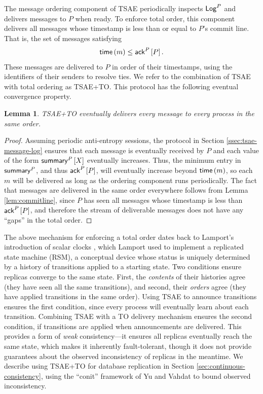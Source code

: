 \documentclass[]             %
{NASA}                       %
\newtheorem{lemma}[theorem]{Lemma}
\theoremstyle{definition}
\begin{document}
The message ordering component of TSAE periodically inspects $\mathsf{Log}^{P}$
and delivers messages to $P$ when ready. To enforce total order, this
component delivers all messages whose timestamp is less than or equal
to $P$'s commit line. That is, the set of messages satisfying
\begin{equation}
  \label{eq:tsae-message-ordering-condition}
  \mathsf{time}\left(m\right) \leq \mathsf{ack}^{P}\left[P\right].
\end{equation}
These messages are delivered to $P$ in order of their timestamps,
using the identifiers of their senders to resolve ties. We refer to
the combination of TSAE with total ordering as TSAE+TO. This protocol
has the following eventual convergence property.

\begin{lemma}
  TSAE+TO eventually delivers every message to every process in the
  same order.
\end{lemma}
\begin{proof}
  Assuming periodic anti-entropy sessions, the protocol in Section
  \ref{ssec:tsae-message-log} ensures that each message is eventually
  received by $P$ and each value of the form $\mathsf{summary}^{P}\left[X\right]$
  eventually increases. Thus, the minimum entry in $\mathsf{summary}^{P}$,
  and thus $\mathsf{ack}^{P}\left[P\right]$, will eventually increase beyond
  $\mathsf{time}\left(m\right)$, so each $m$ will be delivered as long as the
  ordering component runs periodically. The fact that messages are
  delivered in the same order everywhere follows from Lemma
  \ref{lem:commitline}, since $P$ has seen all messages whose
  timestamp is less than $\mathsf{ack}^{P}\left[P\right]$, and therefore the stream of
  deliverable messages does not have any ``gaps'' in the total order.
\end{proof}

The above mechanism for enforcing a total order dates back to
Lamport's introduction of scalar clocks \cite{1978:lamportclocks},
which Lamport used to implement a replicated state machine (RSM), a
conceptual device whose status is uniquely determined by a history of
transitions applied to a starting state. Two conditions ensure
replicas converge to the same state. First, the \emph{contents} of
their histories agree (they have seen all the same transitions), and
second, their \emph{orders} agree (they have applied transitions in
the same order). Using TSAE to announce transitions ensures the first
condition, since every process will eventually learn about each
transition. Combining TSAE with a TO delivery mechanism ensures the
second condition, if transitions are applied when announcements are
delivered. This provides a form of \emph{weak} consistency---it
ensures all replicas eventually reach the same state, which makes it
inherently fault-tolerant, though it does not provide guarantees about
the observed inconsistency of replicas in the meantime. We describe
using TSAE+TO for database replication in Section
\ref{sec:continuous-consistency}, using the ``conit'' framework of Yu
and Vahdat \cite{2002tact} to bound observed inconsistency.
\end{document}
